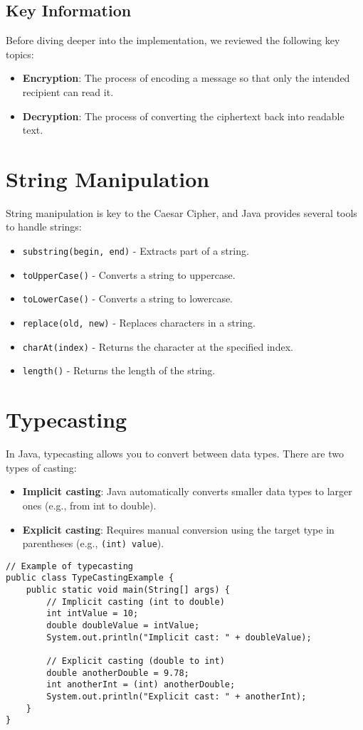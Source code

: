 \documentclass{article}
\begin{document}
\subsection{Key Information}
Before diving deeper into the implementation, we reviewed the following key topics:
\begin{itemize}
    \item \textbf{Encryption}: The process of encoding a message so that only the intended recipient can read it.
    \item \textbf{Decryption}: The process of converting the ciphertext back into readable text.
\end{itemize}

\section{String Manipulation}
String manipulation is key to the Caesar Cipher, and Java provides several tools to handle strings:
\begin{itemize}
    \item \texttt{substring(begin, end)} - Extracts part of a string.
    \item \texttt{toUpperCase()} - Converts a string to uppercase.
    \item \texttt{toLowerCase()} - Converts a string to lowercase.
    \item \texttt{replace(old, new)} - Replaces characters in a string.
    \item \texttt{charAt(index)} - Returns the character at the specified index.
    \item \texttt{length()} - Returns the length of the string.
\end{itemize}

\section{Typecasting}
In Java, typecasting allows you to convert between data types. There are two types of casting:
\begin{itemize}
    \item \textbf{Implicit casting}: Java automatically converts smaller data types to larger ones (e.g., from int to double).
    \item \textbf{Explicit casting}: Requires manual conversion using the target type in parentheses (e.g., \texttt{(int) value}).
\end{itemize}
\begin{lstlisting}
// Example of typecasting
public class TypeCastingExample {
    public static void main(String[] args) {
        // Implicit casting (int to double)
        int intValue = 10;
        double doubleValue = intValue;
        System.out.println("Implicit cast: " + doubleValue);

        // Explicit casting (double to int)
        double anotherDouble = 9.78;
        int anotherInt = (int) anotherDouble;
        System.out.println("Explicit cast: " + anotherInt);
    }
}
\end{lstlisting}
\newpage 
\end{document}
